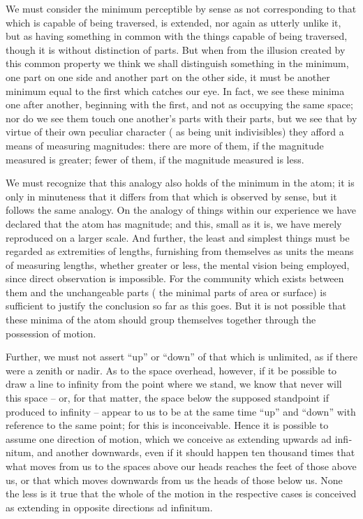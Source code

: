 \documentclass{stex}
\begin{document}
We must consider the minimum perceptible by sense as not corresponding to that which is capable of being traversed, \idEst{} is extended, nor again as utterly unlike it, but as having something in common with the things capable of being traversed, though it is without distinction of parts.
But when from the illusion created by this common property we think we shall distinguish something in the minimum, one part on one side and another part on the other side, it must be another minimum equal to the first which catches our eye.
In fact, we see these minima one after another, beginning with the first, and not as occupying the same space; nor do we see them touch one another's parts with their parts, but we see that by virtue of their own peculiar character (\idEst{} as being unit indivisibles) they afford a means of measuring magnitudes: there are more of them, if the magnitude measured is greater; fewer of them, if the magnitude measured is less.

We must recognize that this analogy also holds of the minimum in the atom; it is only in minuteness that it differs from that which is observed by sense, but it follows the same analogy.
On the analogy of things within our experience we have declared that the atom has magnitude; and this, small as it is, we have merely reproduced on a larger scale.
And further, the least and simplest things must be regarded as extremities of lengths, furnishing from themselves as units the means of measuring lengths, whether greater or less, the mental vision being employed, since direct observation is impossible.
For the community which exists between them and the unchangeable parts (\idEst{} the minimal parts of area or surface) is sufficient to justify the conclusion so far as this goes.
But it is not possible that these minima of the atom should group themselves together through the possession of motion.

Further, we must not assert \enquote{up} or \enquote{down} of that which is unlimited, as if there were a zenith or nadir.
As to the space overhead, however, if it be possible to draw a line to infinity from the point where we stand, we know that never will this space – or, for that matter, the space below the supposed standpoint if produced to infinity – appear to us to be at the same time \enquote{up} and \enquote{down} with reference to the same point; for this is inconceivable.
Hence it is possible to assume one direction of motion, which we conceive as extending upwards \foreignlanguage{latin}{ad infinitum}, and another downwards, even if it should happen ten thousand times that what moves from us to the spaces above our heads reaches the feet of those above us, or that which moves downwards from us the heads of those below us.
None the less is it true that the whole of the motion in the respective cases is conceived as extending in opposite directions \foreignlanguage{latin}{ad infinitum}.
\end{document}
